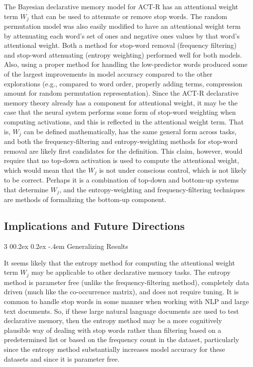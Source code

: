 \documentclass[man,floatsintext,donotrepeattitle]{apa6}
\makeatletter
\renewcommand{\subsubsection}{%
  \@startsection
  {subsubsection}%
  {3}%
  {\parindent}%
  {0\baselineskip \@plus 0.2ex \@minus 0.2ex}%
  {-.4em}%
  {\normalfont\normalsize\bfseries\addperi}}
\makeatother
\begin{document}
The Bayesian declarative memory model for ACT-R has an attentional weight term $W_{j}$ that can be used to attenuate or remove stop words.
The random permutation model was also easily modified to have an attentional weight term by attenuating each word's set of ones and negative ones values by that word's attentional weight.
Both a method for stop-word removal (frequency filtering) and stop-word attenuating (entropy weighting) performed well for both models.
Also, using a proper method for handling the low-predictor words produced some of the largest improvements in model accuracy compared to the other explorations
(e.g., compared to word order, properly adding terms, compression amount for random permutation representation).
Since the ACT-R declarative memory theory already has a component for attentional weight, it may be the case that the neural system performs some form of stop-word weighting when computing activations,
and this is reflected in the attentional weight term.
That is, $W_{j}$ can be defined mathematically, has the same general form across tasks, and both the frequency-filtering and entropy-weighting methods for stop-word removal are likely first candidates for the definition.
This claim, however, would require that no top-down activation is used to compute the attentional weight, which would mean that the $W_{j}$ is not under conscious control, which is not likely to be correct.
Perhaps it is a combination of top-down and bottom-up systems that determine $W_{j}$, and the entropy-weighting and frequency-filtering techniques are methods of formalizing the bottom-up component.

\subsection{Implications and Future Directions}

\subsubsection{Generalizing Results}

It seems likely that the entropy method for computing the attentional weight term $W_{j}$ may be applicable to other declarative memory tasks.
The entropy method is parameter free (unlike the frequency-filtering method), completely data driven (much like the co-occurrence matrix), and does not require tuning.
It is common to handle stop words in some manner when working with NLP and large text documents.
So, if these large natural language documents are used to test declarative memory, then the entropy method may be a more cognitively plausible way of dealing with stop words rather than 
filtering based on a predetermined list or based on the frequency count in the dataset, particularly since the entropy method substantially increases model accuracy for these datasets and since it is parameter free.
\end{document}
